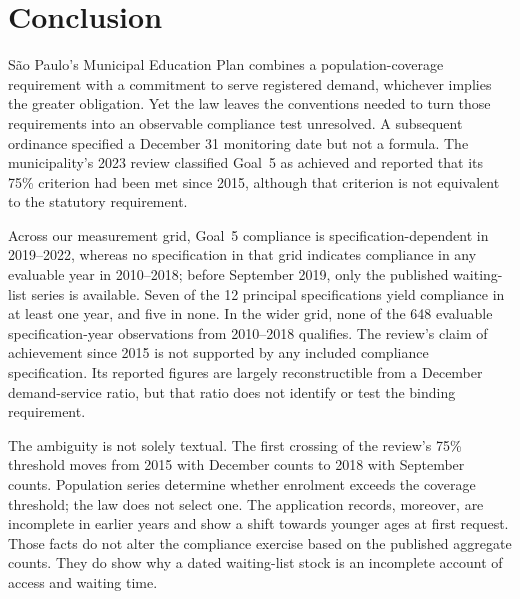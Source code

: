 
\section{Conclusion}\label{sec:conclusion}

S\~ao Paulo's Municipal Education Plan combines a population-coverage requirement with a commitment to serve registered demand, whichever implies the greater obligation. Yet the law leaves the conventions needed to turn those requirements into an observable compliance test unresolved. A subsequent ordinance specified a December 31 monitoring date \citep{sme2016portaria7972} but not a formula. The municipality's 2023 review classified Goal~5 as achieved \citep{saopaulo2023conferencia} and reported that its 75\% criterion had been met since 2015, although that criterion is not equivalent to the statutory requirement.

Across our measurement grid, Goal~5 compliance is specification-dependent in 2019--2022, whereas no specification in that grid indicates compliance in any evaluable year in 2010--2018; before September 2019, only the published waiting-list series is available. Seven of the 12 principal specifications yield compliance in at least one year, and five in none. In the wider grid, none of the 648 evaluable specification-year observations from 2010--2018 qualifies. The review's claim of achievement since 2015 is not supported by any included compliance specification. Its reported figures are largely reconstructible from a December demand-service ratio, but that ratio does not identify or test the binding requirement.

The ambiguity is not solely textual. The first crossing of the review's 75\% threshold moves from 2015 with December counts to 2018 with September counts. Population series determine whether enrolment exceeds the coverage threshold; the law does not select one. The application records, moreover, are incomplete in earlier years and show a shift towards younger ages at first request. Those facts do not alter the compliance exercise based on the published aggregate counts. They do show why a dated waiting-list stock is an incomplete account of access and waiting time.


